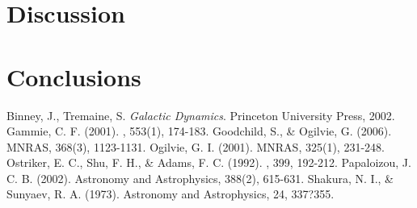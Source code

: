 \documentclass[apj]{emulateapj}
\begin{document}
\section{Discussion}


\section{Conclusions}

\begin{thebibliography}{}
 Binney, J., Tremaine, S. \emph{Galactic Dynamics}. Princeton University Press, 2002.
 Gammie, C. F. (2001). \apj, 553(1), 174-183. 
 Goodchild, S., \& Ogilvie, G. (2006). MNRAS, 368(3), 1123-1131. 
 Ogilvie, G. I. (2001). MNRAS, 325(1), 231-248. 
 Ostriker, E. C., Shu, F. H., \& Adams, F. C. (1992). \apj, 399, 192-212. 
 Papaloizou, J. C. B. (2002). Astronomy and Astrophysics, 388(2), 615-631. 
 Shakura, N. I., \& Sunyaev, R. A. (1973). Astronomy and Astrophysics, 24, 337?355.
\end{thebibliography}
\end{document}

